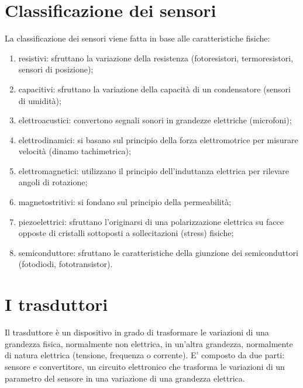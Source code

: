 \documentclass[a4paper,12pt]{article}
\begin{document}
\section{Classificazione dei sensori}
La classificazione dei sensori viene fatta in base alle caratteristiche fisiche:
\begin{enumerate}
\item resistivi: sfruttano la variazione della resistenza (fotoresistori, termoresistori, sensori di posizione);
\item capacitivi: sfruttano la variazione della capacità di un condensatore (sensori di umidità);
\item elettroacustici: convertono segnali sonori in grandezze elettriche (microfoni);
\item elettrodinamici: si basano sul principio della forza elettromotrice per misurare velocità (dinamo tachimetrica);
\item elettromagnetici: utilizzano il principio dell'induttanza elettrica per rilevare angoli di rotazione;
\item magnetostritivi: si fondano sul principio della permeabilità;
\item piezoelettrici: sfruttano l'originarsi di una polarizzazione elettrica su facce opposte di cristalli sottoposti a sollecitazioni (stress) fisiche;
\item semiconduttore: sfruttano le caratteristiche della giunzione dei semiconduttori (fotodiodi, fototransistor).
\end{enumerate}

\section{I trasduttori}
Il trasduttore è un dispositivo in grado di trasformare le variazioni di una grandezza fisica,
normalmente non elettrica, in un'altra grandezza, normalmente di natura elettrica (tensione, frequenza o corrente). E' composto da due parti: sensore e convertitore, un circuito elettronico che trasforma le variazioni di un parametro del sensore in una variazione di una grandezza elettrica.
\end{document}
